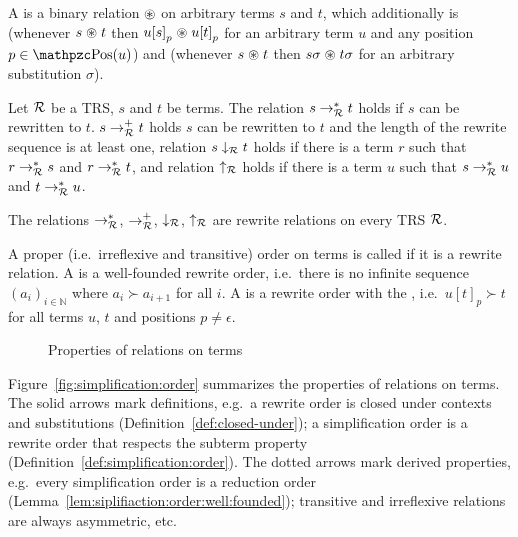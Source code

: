 %
\begin{definition}\label{def:closed-under}
	A  is a binary relation
	\( \mathrel{\circledast} \) on arbitrary terms \( s \) and \( t \),
	which additionally is 
	(whenever \( s\mathrel{\circledast} t \) then \( u{[s]}_p\mathrel{\circledast} u{[t]}_p \)
	for an arbitrary term \( u \) and any position \( p\in\pos(u) \))
	and 
	(whenever \( s\mathrel{\circledast} t \) then \( s\sigma\mathrel{\circledast} t\sigma \)
	for an arbitrary substitution \( \sigma \)).
\end{definition}
\begin{definition}
	Let \( \mathcal{R} \) be a TRS, \( s \) and \( t \) be terms.
	The relation \( s \rightarrow^*_{\mathcal{R}} t \) holds if \( s \) can be rewritten to \( t \).
	\( s \rightarrow^+_{\mathcal{R}} t \) holds \( s \) can be rewritten to \( t \)
	and the length of the rewrite sequence is at least one,
	relation \( s \downarrow_{\mathcal{R}} t \) holds if there is a term \( r \) such that
	\( r \rightarrow^*_{\mathcal{R}} s \) and \( r \rightarrow^*_{\mathcal{R}} t \), and
	relation \( \uparrow_{\mathcal{R}} \) holds if there is a term \( u \) such that
	\( s \rightarrow^*_{\mathcal{R}} u \) and \( t \rightarrow^*_{\mathcal{R}} u \).
\end{definition}
\begin{lemma}
	The relations \( \rightarrow^*_{\mathcal{R}} \),
	\( \rightarrow^+_{\mathcal{R}} \),
	\( \downarrow_{\mathcal{R}} \), \( \uparrow_{\mathcal{R}} \) are rewrite relations on every TRS \( \mathcal{R} \).
\end{lemma}
\begin{definition}\label{def:simplification:order}
	A proper (i.e.~irreflexive and transitive) order on terms is called  if it is a rewrite relation.
	A  is a well-founded rewrite order,
	i.e.~there is no infinite sequence
	\( {(a_i)}_{i\in\mathbb{N}} \)
	where \( a_i\succ a_{i+1} \) for all \( i \).
	A  is a rewrite order with the ,
	i.e.~\( u{[t]}_p \succ t \) for all terms \( u \), \( t \) and positions \( p\neq\epsilon \).
\end{definition}

\begin{figure}[htb]\label{fig:simplification:order}
	
	\caption{Properties of relations on terms}
\end{figure}

Figure~\vref{fig:simplification:order} summarizes the properties of relations on terms.
The solid arrows mark definitions,
e.g.~a rewrite order is closed under contexts and substitutions (Definition~\ref{def:closed-under});
a simplification order is a rewrite order
that respects the subterm property
(Definition~\ref{def:simplification:order}).
The dotted arrows mark derived properties,
e.g.~every simplification order is a reduction order
(Lemma~\ref{lem:siplifiaction:order:well:founded});
transitive and irreflexive relations are always asymmetric,
etc.

